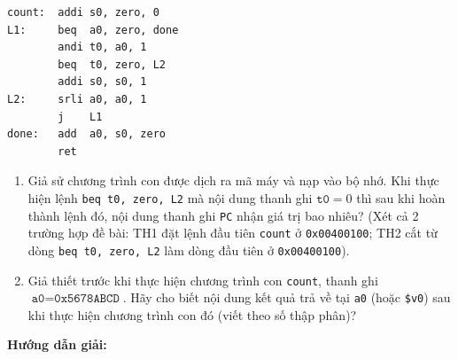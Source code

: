 \noindent\begin{minipage}{\linewidth}
\begin{lstlisting}
count:  addi s0, zero, 0
L1:     beq  a0, zero, done
        andi t0, a0, 1
        beq  t0, zero, L2
        addi s0, s0, 1
L2:     srli a0, a0, 1
        j    L1
done:   add  a0, s0, zero
        ret
\end{lstlisting}
\end{minipage}
\begin{enumerate}[label=\alph*)]
    \item Giả sử chương trình con được dịch ra mã máy và nạp vào bộ nhớ. Khi thực hiện lệnh \texttt{beq t0, zero, L2} mà nội dung thanh ghi $\texttt{t0} = 0$ thì sau khi hoàn thành lệnh đó, nội dung thanh ghi \texttt{PC} nhận giá trị bao nhiêu? (Xét cả 2 trường hợp đề bài: TH1 đặt lệnh đầu tiên \texttt{count} ở \texttt{0x00400100}; TH2 cắt từ dòng \texttt{beq t0, zero, L2} làm dòng đầu tiên ở \texttt{0x00400100}).
    \item Giả thiết trước khi thực hiện chương trình con \texttt{count}, thanh ghi $\texttt{a0} = \texttt{0x5678ABCD}$. Hãy cho biết nội dung kết quả trả về tại \texttt{a0} (hoặc \texttt{\$v0}) sau khi thực hiện chương trình con đó (viết theo số thập phân)?
\end{enumerate}
\textbf{Hướng dẫn giải:}
